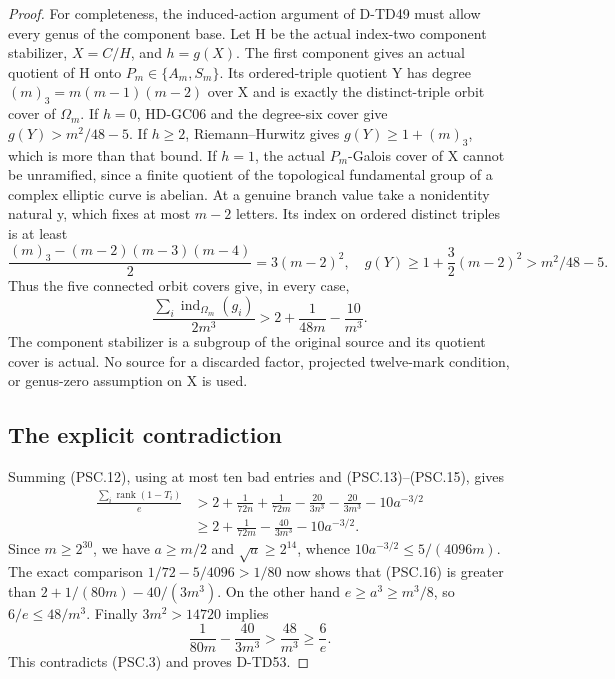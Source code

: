 \begin{proof}
For completeness, the induced-action argument of D-TD49 must
allow every genus of the component base.  Let H be the actual
index-two component stabilizer, \(X=C/H\), and \(h=g(X)\).
The first component gives an actual quotient of H onto
\(P_m\in\{A_m,S_m\}\).  Its ordered-triple quotient Y has
degree \((m)_3=m(m-1)(m-2)\) over X and is exactly the
distinct-triple orbit cover of \(\Omega_m\).
If \(h=0\), HD-GC06 and the degree-six cover give
\(g(Y)>m^2/48-5\).
If \(h\ge2\), Riemann--Hurwitz gives
\(g(Y)\ge1+(m)_3\), which is more than that bound.
If \(h=1\), the actual \(P_m\)-Galois cover of X cannot
be unramified, since a finite quotient of the topological
fundamental group of a complex elliptic curve is abelian.
At a genuine branch value take a nonidentity natural y,
which fixes at most \(m-2\) letters.  Its index on ordered
distinct triples is at least
\[
 \frac{(m)_3-(m-2)(m-3)(m-4)}2=3(m-2)^2,
 \quad
 g(Y)\ge1+\frac32(m-2)^2>m^2/48-5.
 \tag{PSC.14}
\]
Thus the five connected orbit covers give, in every case,
\[
 \frac{\sum_i\operatorname{ind}_{\Omega_m}(g_i)}{2m^3}
                       >2+\frac1{48m}-\frac{10}{m^3}.
 \tag{PSC.15}
\]
The component stabilizer is a subgroup of the original source
and its quotient cover is actual.  No source for a discarded
factor, projected twelve-mark condition, or genus-zero
assumption on X is used.

\subsection*{The explicit contradiction}

Summing (PSC.12), using at most ten bad entries and
(PSC.13)--(PSC.15), gives
\[
 \begin{split}
 \frac{\sum_i\operatorname{rank}(1-T_i)}e
 &>2+\frac1{72n}+\frac1{72m}
           -\frac{20}{3n^3}-\frac{20}{3m^3}-10a^{-3/2}\\
 &\ge2+\frac1{72m}-\frac{40}{3m^3}-10a^{-3/2}.
 \end{split}
 \tag{PSC.16}
\]
Since \(m\ge2^{30}\), we have \(a\ge m/2\) and
\(\sqrt a\ge2^{14}\), whence
\(10a^{-3/2}\le5/(4096m)\).
The exact comparison \(1/72-5/4096>1/80\) now shows that
(PSC.16) is greater than
\(2+1/(80m)-40/(3m^3)\).
On the other hand \(e\ge a^3\ge m^3/8\), so \(6/e\le48/m^3\).
Finally \(3m^2>14720\) implies
\[
                   \frac1{80m}-\frac{40}{3m^3}
                        >\frac{48}{m^3}\ge\frac6e.
 \tag{PSC.17}
\]
This contradicts (PSC.3) and proves D-TD53.
\end{proof}

